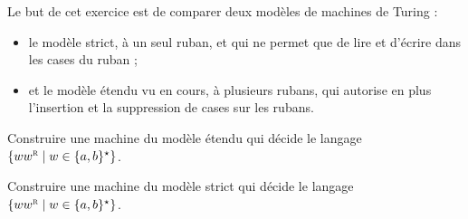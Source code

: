 
\begingroup

\begin{exercice}\label{exo:turingmachines/expressiveness/models}

  Le but de cet exercice est de comparer deux modèles de machines de Turing :
  \begin{itemize}
    \item le modèle strict, à un seul ruban, et qui ne permet que de lire et d'écrire dans les cases du ruban ; 
    \item et le modèle étendu vu en cours, à plusieurs rubans, qui autorise en plus l'insertion et la suppression de cases sur les rubans.
  \end{itemize}

  \begin{question}
  \item Construire une machine du modèle étendu qui décide le langage $\{ww^\textsc{r} \mid w \in \{a, b\}^\star\}$.
  \end{question}
  \begin{correction}
  \end{correction}

  \begin{question}
  \item Construire une machine du modèle strict qui décide le langage $\{ww^\textsc{r} \mid w \in \{a, b\}^\star\}$.
  \end{question}
  \begin{correction}
\end{correction}
\end{exercice}
